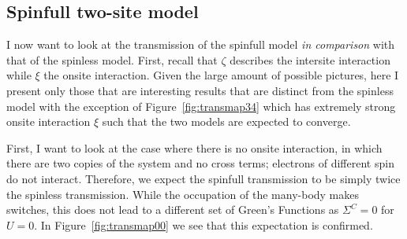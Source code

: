 \subsection{Spinfull two-site model}
I now want to look at the transmission of the spinfull model \emph{in comparison} with that of the spinless model. First, recall that $\zeta$ describes the intersite interaction while $\xi$ the onsite interaction. Given the large amount of possible pictures, here I present only those that are interesting results that are distinct from the spinless model with the exception of Figure~\ref{fig:transmap34} which has extremely strong onsite interaction $\xi$ such that the two models are expected to converge.


First, I want to look at the case where there is no onsite interaction, in which there are two copies of the system and no cross terms; electrons of different spin do not interact. Therefore, we expect the spinfull transmission to be simply twice the spinless transmission. While the occupation of the many-body makes switches, this does not lead to a different set of Green's Functions as $\Sigma^C=0$ for $U=0$. In Figure~\ref{fig:transmap00} we see that this expectation is confirmed. 

